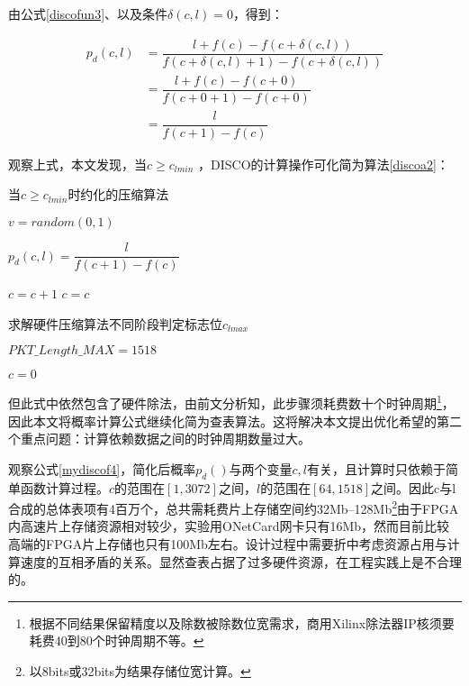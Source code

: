 由公式\ref{discofun3}、以及条件$ \delta(c,l)=0$，得到：

\begin{align}\label{mydiscof4}
p_d(c,l) &= \dfrac{l+f(c)-f(c+\delta(c,l))}{f(c+\delta(c,l)+1)-f(c+\delta(c,l))}  \nonumber \\
&= \dfrac{l+f(c)-f(c+0)}{f(c+0+1)-f(c+0)} \nonumber  \\
&= \dfrac{l}{f(c+1)-f(c)} 
\end{align}



观察上式，本文发现，当$ c \geq c_{lmin} $ ，DISCO的计算操作可化简为算法\ref{discoa2}：

\begin{algorithm}[ht]
	\caption{当$ c \geq c_{lmin} $时约化的压缩算法 \label{discoa2}}
	\IncMargin{2em}
	\DontPrintSemicolon
	$ v = random(0,1) $

	$ p_d(c,l)=\dfrac{l}{f(c+1)-f(c)} $ 
	
	{$ c = c +  1 $ }
	{$ c = c   $ }
\end{algorithm}

\begin{algorithm}[ht]
	\caption{求解硬件压缩算法不同阶段判定标志位$c_{lmax}$  \label{mydiscoa2}}
	\IncMargin{2em}
	\DontPrintSemicolon
	$ 	PKT\_Length\_MAX = 1518 $
	
	$ c=0 $
	
	
\end{algorithm}

但此式中依然包含了硬件除法，由前文分析知，此步骤须耗费数十个时钟周期\footnote{根据不同结果保留精度以及除数被除数位宽需求，商用Xilinx除法器IP核须要耗费40到80个时钟周期不等。}，因此本文将概率计算公式继续化简为查表算法。这将解决本文提出优化希望的第二个重点问题：计算依赖数据之间的时钟周期数量过大。

观察公式\ref{mydiscof4}，简化后概率$ p_d() $与两个变量$ c,l $有关，且计算时只依赖于简单函数计算过程。$ c $的范围在$ [1,3072] $之间，$ l $的范围在$ [64,1518] $之间。因此c与l合成的总体表项有4百万个，总共需耗费片上存储空间约32Mb--128Mb\footnote{以8bits或32bits为结果存储位宽计算。}由于FPGA内高速片上存储资源相对较少，实验用ONetCard网卡只有16Mb，然而目前比较高端的FPGA片上存储也只有100Mb左右。设计过程中需要折中考虑资源占用与计算速度的互相矛盾的关系。显然查表占据了过多硬件资源，在工程实践上是不合理的。

